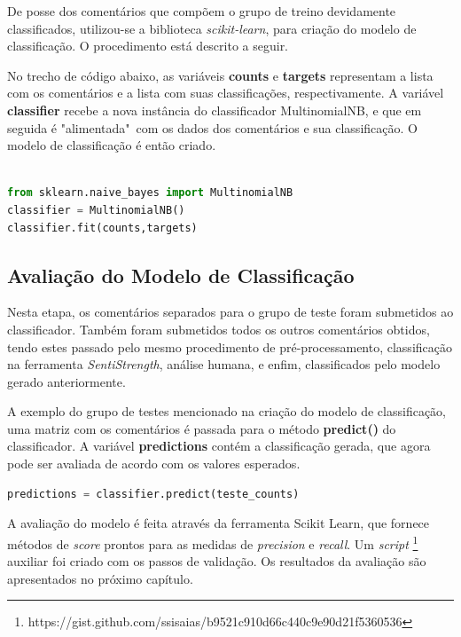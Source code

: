 De posse dos comentários que compõem o grupo de treino devidamente classificados, utilizou-se a biblioteca \textit{scikit-learn}, para criação do modelo de classificação. O procedimento está descrito a seguir. 

No trecho de código abaixo, as variáveis \textbf{counts} e \textbf{targets} representam a lista com os comentários e a lista com suas classificações, respectivamente. A variável \textbf{classifier} recebe a nova instância do classificador MultinomialNB, e que em seguida é "alimentada"\ com os dados dos comentários e sua classificação. O modelo de classificação é então criado.

\begin{lstlisting}[frame=single, language=Python]  % Start your code-block

from sklearn.naive_bayes import MultinomialNB 
classifier = MultinomialNB()
classifier.fit(counts,targets)

\end{lstlisting}


\subsection{Avaliação do Modelo de Classificação}

Nesta etapa, os comentários separados para o grupo de teste foram submetidos ao classificador. Também foram submetidos todos os outros comentários obtidos, tendo estes passado pelo mesmo procedimento de pré-processamento, classificação na ferramenta \textit{SentiStrength}, análise humana, e enfim, classificados pelo modelo gerado anteriormente.

A exemplo do grupo de testes mencionado na criação do modelo de classificação, uma matriz com os comentários é passada para o método \textbf{predict()} do classificador. A variável \textbf{predictions} contém a classificação gerada, que agora pode ser avaliada de acordo com os valores esperados.

\begin{lstlisting}[frame=single, language=Python]  
predictions = classifier.predict(teste_counts)
\end{lstlisting}

A avaliação do modelo é feita através da ferramenta Scikit Learn, que fornece métodos de \textit{score} prontos para as medidas de \textit{precision} e \textit{recall}. Um \textit{script} \footnote{https://gist.github.com/ssisaias/b9521c910d66c440c9e90d21f5360536} auxiliar foi criado com os passos de validação. Os resultados da avaliação são apresentados no próximo capítulo.




